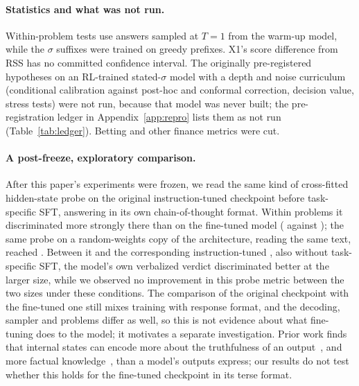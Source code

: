 \paragraph{Statistics and what was not run.}
Within-problem tests use answers sampled at $T = 1$ from the warm-up model, while the $\sigma$ suffixes were trained on
greedy prefixes.
X1's score difference from RSS has no committed confidence interval.
The originally pre-registered hypotheses on an RL-trained stated-$\sigma$ model with a depth and noise curriculum
(conditional calibration against post-hoc and conformal correction, decision value, stress tests) were not run,
because that model was never built; the pre-registration ledger in Appendix~\ref{app:repro} lists them as not run (Table~\ref{tab:ledger}).
Betting and other finance metrics were cut.

\paragraph{A post-freeze, exploratory comparison.}
After this paper's experiments were frozen, we read the same kind of cross-fitted hidden-state probe on the original
instruction-tuned  checkpoint before task-specific SFT, answering in its own chain-of-thought format.
Within problems it discriminated more strongly there than on the fine-tuned model ( against
); the same probe on a random-weights copy of the architecture, reading the same text, reached
.
Between it and the corresponding instruction-tuned , also without task-specific SFT, the model's
own verbalized verdict discriminated better at the larger size, while we observed no improvement in this probe metric
between the two sizes under these conditions.
The comparison of the original checkpoint with the fine-tuned one still mixes training with response format, and the
decoding, sampler and problems differ as well, so this is not evidence about what fine-tuning does to the model; it
motivates a separate investigation.
Prior work finds that internal states can encode more about the truthfulness of an output~\citep{orgad2025know}, and
more factual knowledge~\citep{gekhman2025insideout}, than a model's outputs express; our results do not test whether
this holds for the fine-tuned checkpoint in its terse format.
